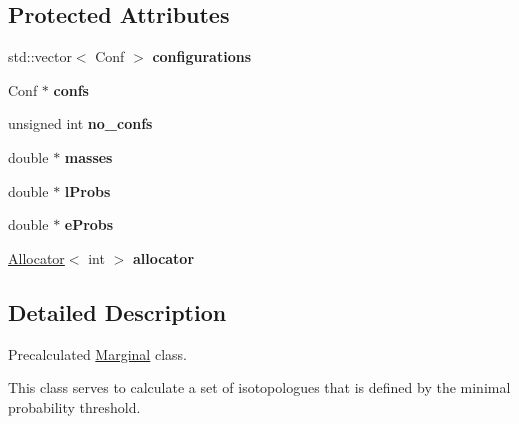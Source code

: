 \subsection*{Protected Attributes}
\begin{DoxyCompactItemize}
\item 
\mbox{\label{class_iso_spec_1_1_precalculated_marginal_adaba0751ea134b2cbd6c3fdf67c327ea}} 
std\+::vector$<$ Conf $>$ {\bfseries configurations}
\item 
\mbox{\label{class_iso_spec_1_1_precalculated_marginal_a1197bed742b2139243e9dc71cb8fcdfc}} 
Conf $\ast$ {\bfseries confs}
\item 
\mbox{\label{class_iso_spec_1_1_precalculated_marginal_ad82d7aef36c946ce4f9bbf3ddac70cd1}} 
unsigned int {\bfseries no\+\_\+confs}
\item 
\mbox{\label{class_iso_spec_1_1_precalculated_marginal_a94e78eba4ae89c0d6c811d7bc0085684}} 
double $\ast$ {\bfseries masses}
\item 
\mbox{\label{class_iso_spec_1_1_precalculated_marginal_afd5a4a7b094038f66eda31c6827a66f9}} 
double $\ast$ {\bfseries l\+Probs}
\item 
\mbox{\label{class_iso_spec_1_1_precalculated_marginal_abf3e9faabf5011f75cfb8e89cb3cdcca}} 
double $\ast$ {\bfseries e\+Probs}
\item 
\mbox{\label{class_iso_spec_1_1_precalculated_marginal_add0495cfc67fd8b9757b93b07d47e6cf}} 
\mbox{\hyperlink{class_iso_spec_1_1_allocator}{Allocator}}$<$ int $>$ {\bfseries allocator}
\end{DoxyCompactItemize}


\subsection{Detailed Description}
Precalculated \mbox{\hyperlink{class_iso_spec_1_1_marginal}{Marginal}} class. 

This class serves to calculate a set of isotopologues that is defined by the minimal probability threshold.

